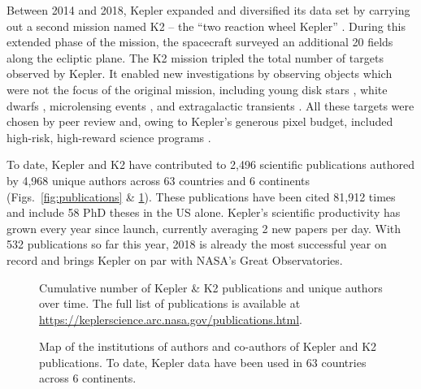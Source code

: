 \documentclass[modern]{aastex62}
\begin{document}
Between 2014 and 2018, Kepler expanded and diversified its data set by carrying out a second mission named K2 -- the ``two reaction wheel Kepler'' \citep{howell2014}.  During this extended phase of the mission, the spacecraft surveyed an additional 20 fields along the ecliptic plane. The K2 mission tripled the total number of targets observed by Kepler. It enabled new investigations by observing objects which were not the focus of the original mission, including
young disk stars \citep[e.g.][]{ansdell2016},
white dwarfs \citep[e.g.][]{hermes2017},
microlensing events \citep[e.g.][]{henderson2016},
and extragalactic transients \citep[e.g.][]{rest2018}. All these targets were chosen by peer review and, owing to Kepler's generous pixel budget, included high-risk, high-reward science programs \citep[e.g. the search for planets around white dwarfs;][]{sluijs2018}. 

To date, Kepler and K2 have contributed to 2,496 scientific publications authored by 4,968 unique authors across 63 countries and 6 continents (Figs.~\ref{fig:publications} \& \ref{fig:map}). These publications have been cited 81,912 times and include 58 PhD theses in the US alone. Kepler's scientific productivity has grown every year since launch, currently averaging 2 new papers per day. With 532 publications so far this year, 2018 is already the most successful year on record and brings Kepler on par with NASA's Great Observatories. 

\begin{figure}

\vspace{10mm}

\caption{Cumulative number of Kepler \& K2 publications and unique authors over time.  The full list of publications is available at \url{https://keplerscience.arc.nasa.gov/publications.html}.\label{fig:publications}}

\vspace{10mm}

\caption{Map of the institutions of authors and co-authors of Kepler and K2 publications. To date, Kepler data have been used in 63 countries across 6 continents.\label{fig:map}}
\end{figure}
\end{document}
